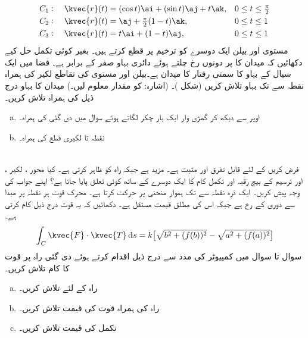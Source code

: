 \begin{align*}
C_1:\quad \kvec{r}(t)&=(\cos t)\ai+(\sin t)\aj+t\ak,&& 0\le t\le \tfrac{\pi}{2}\\
C_2:\quad \kvec{r}(t)&=\aj+\tfrac{\pi}{2}(1-t)\ak,&& 0\le t\le 1\\
C_3:\quad \kvec{r}(t)&=t\ai+(1-t)\aj,&& 0\le t\le 1
\end{align*}
مستوی  اور بیلن  ایک دوسرے کو ترخیم  پر قطع کرتے ہیں۔ بغیر کوئی تکمل  حل کیے   دکھائیں کہ میدان  کا  پر دونوں رخ چلتے ہوئے دائری بہاو صفر کے برابر ہے۔
فضا میں ایک سیال کے بہاو کا سمتی رفتار کا میدان  ہے۔بیلن  اور مستوی  کی تقاطع لکیر کی ہمراہ نقطہ  سے  تک  بہاو تلاش کریں (شکل )۔ (اشارہ:  کو مقدار معلوم لیں۔)
میدان  کا بہاو درج ذیل کی ہمراہ تلاش کریں۔
\begin{enumerate}[a.]
\item
اوپر سے دیکھ کر گھڑی وار ایک بار چکر لگاتے ہوئے سوال  میں دی گئی  کی ہمراہ۔
\item
نقطہ  تا  لکیری قطع کی ہمراہ۔

\end{enumerate}
\\
فرض کریں   کے لئے  قابل تفرق اور مثبت ہے۔ مزید  ہے جبکہ  راہ    کو  ظاہر کرتی ہے۔ کیا محور ، لکیر ،  اور ترسیم  کے بیچ رقبہ اور  تکمل کام   کا  ایک دوسرے کے ساتھ  کوئی تعلق پایا جاتا ہے؟ اپنے جواب کی وجہ پیش کریں۔
ایک ذرہ نقطہ  سے  تک ہموار منحنی  پر حرکت کرتا ہے۔ محرک قوت ہر نقطہ پر مبدا سے دوری کے رخ ہے  جبکہ اس کی مطلق قیمت  مستقل  ہے۔ دکھائیں کہ یہ قوت درج ذیل کام کرتی ہے۔
\[\int_C\kvec{F}\cdot \kvec{T}\dif s=k\big[\sqrt{b^2+(f(b))^2}-\sqrt{a^2+(f(a))^2}\big]\]  
سوال  تا سوال  میں کمپیوٹر کی مدد سے درج ذیل اقدام کرتے ہوئے دی گئی راہ پر قوت  کا کام تلاش کریں۔
\begin{enumerate}[a.]
\item
راہ  کے لئے  تلاش کریں۔
\item
راہ کی ہمراہ  قوت  کی قیمت تلاش کریں۔
\item
تکمل  کی قیمت تلاش کریں۔
\end{enumerate}

